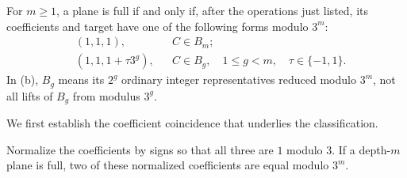 \begin{theorem}\label{metric:classification}
For $m\geq1$, a plane is full if and only if, after the operations just
listed, its coefficients and target have one of the following forms
modulo $3^m$:
\begin{align*}
 &(1,1,1),&& C\in B_m;\tag{a}\label{metric:classa}\\
 &(1,1,1+\tau3^g),&& C\in B_g,
       \quad 1\leq g<m,\quad\tau\in\{-1,1\}.\tag{b}\label{metric:classb}
\end{align*}
In (b), $B_g$ means its $2^g$ ordinary integer representatives reduced
modulo $3^m$, not all lifts of $B_g$ from modulus $3^g$.
\end{theorem}

We first establish the coefficient coincidence that underlies the
classification.

\begin{lemma}\label{metric:coincidence}
Normalize the coefficients by signs so that all three are $1$ modulo
$3$. If a depth-$m$ plane is full, two of these normalized coefficients
are equal modulo $3^m$.
\end{lemma}


